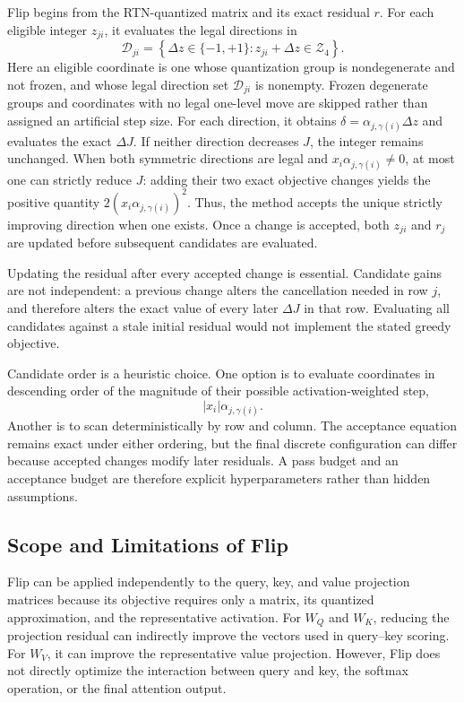 Flip begins from the RTN-quantized matrix and its exact residual $r$. For each eligible integer $z_{ji}$, it evaluates the legal directions in
\begin{equation}
\mathcal{D}_{ji}
=\left\{
\Delta z\in\{-1,+1\}:
z_{ji}+\Delta z\in\mathcal{Z}_4
\right\}.
\end{equation}
Here an eligible coordinate is one whose quantization group is nondegenerate and not frozen, and whose legal direction set $\mathcal{D}_{ji}$ is nonempty. Frozen degenerate groups and coordinates with no legal one-level move are skipped rather than assigned an artificial step size.
For each direction, it obtains $\delta=\alpha_{j,\gamma(i)}\Delta z$ and evaluates the exact $\Delta J$. If neither direction decreases $J$, the integer remains unchanged. When both symmetric directions are legal and $x_i\alpha_{j,\gamma(i)}\neq0$, at most one can strictly reduce $J$: adding their two exact objective changes yields the positive quantity $2(x_i\alpha_{j,\gamma(i)})^2$. Thus, the method accepts the unique strictly improving direction when one exists. Once a change is accepted, both $z_{ji}$ and $r_j$ are updated before subsequent candidates are evaluated.

Updating the residual after every accepted change is essential. Candidate gains are not independent: a previous change alters the cancellation needed in row $j$, and therefore alters the exact value of every later $\Delta J$ in that row. Evaluating all candidates against a stale initial residual would not implement the stated greedy objective.

Candidate order is a heuristic choice. One option is to evaluate coordinates in descending order of the magnitude of their possible activation-weighted step,
\begin{equation}
|x_i|\alpha_{j,\gamma(i)}.
\end{equation}
Another is to scan deterministically by row and column. The acceptance equation remains exact under either ordering, but the final discrete configuration can differ because accepted changes modify later residuals. A pass budget and an acceptance budget are therefore explicit hyperparameters rather than hidden assumptions.

\subsection{Scope and Limitations of Flip}

Flip can be applied independently to the query, key, and value projection matrices because its objective requires only a matrix, its quantized approximation, and the representative activation. For $W_Q$ and $W_K$, reducing the projection residual can indirectly improve the vectors used in query--key scoring. For $W_V$, it can improve the representative value projection. However, Flip does not directly optimize the interaction between query and key, the softmax operation, or the final attention output.

